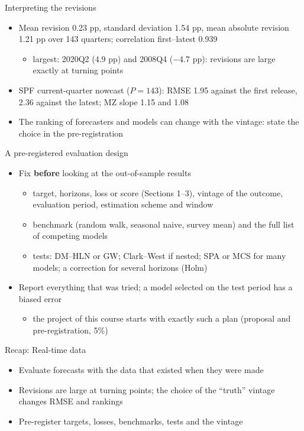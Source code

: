 \begin{frame}{Interpreting the revisions}
\itemsize{\small}
\begin{itemize}
    \item Mean revision 0.23 pp, standard deviation 1.54 pp, mean absolute revision 1.21 pp over 143 quarters; correlation first--latest 0.939
    \begin{itemize}
        \item largest: 2020Q2 (4.9 pp) and 2008Q4 (\ensuremath{-}4.7 pp): revisions are large exactly at turning points
    \end{itemize}
    \item SPF current-quarter nowcast ($P = 143$): RMSE 1.95 against the first release, 2.36 against the latest; MZ slope 1.15 and 1.08
    \item The ranking of forecasters and models can change with the vintage: state the choice in the pre-registration
\end{itemize}
\end{frame}

\begin{frame}{A pre-registered evaluation design}
\itemsize{\small}
\begin{itemize}
    \item Fix \textbf{before} looking at the out-of-sample results
    \begin{itemize}
        \item target, horizons, loss or score (Sections 1--3), vintage of the outcome, evaluation period, estimation scheme and window
        \item benchmark (random walk, seasonal naive, survey mean) and the full list of competing models
        \item tests: DM--HLN or GW; Clark--West if nested; SPA or MCS for many models; a correction for several horizons (Holm)
    \end{itemize}
    \item Report everything that was tried; a model selected on the test period has a biased error
    \begin{itemize}
        \item the project of this course starts with exactly such a plan (proposal and pre-registration, 5\%)
    \end{itemize}
\end{itemize}
\end{frame}

\begin{frame}{Recap: Real-time data}
\itemsize{\small}
\begin{itemize}
    \item Evaluate forecasts with the data that existed when they were made
    \item Revisions are large at turning points; the choice of the ``truth'' vintage changes RMSE and rankings
    \item Pre-register targets, losses, benchmarks, tests and the vintage
\end{itemize}
\end{frame}


